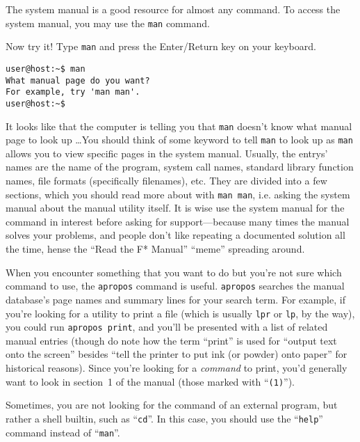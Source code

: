 \documentclass{extbook}
\begin{document}
The system manual is a good resource for almost any command.  To access the system manual, you may use the \verb|man| command.

Now try it!  Type \verb|man| and press the Enter/Return key on your keyboard.
\begin{verbatim}
user@host:~$ man
What manual page do you want?
For example, try 'man man'.
user@host:~$ 
\end{verbatim}

It looks like that the computer is telling you that \verb|man| doesn't know what manual page to look up \ldots You should think of some keyword to tell \verb|man| to look up as \verb|man| allows you to view specific pages in the system manual.  Usually, the entrys' names are the name of the program, system call names, standard library function names, file formats (specifically filenames), etc.  They are divided into a few sections, which you should read more about with \verb|man man|, i.e. asking the system manual about the manual utility itself.  It is wise use the system manual for the command in interest before asking for support---because many times the manual solves your problems, and people don't like repeating a documented solution all the time, hense the ``Read the F* Manual'' ``meme'' spreading around.

When you encounter something that you want to do but you're not sure which command to use, the \verb|apropos| command is useful.  \verb|apropos| searches the manual database's page names and summary lines for your search term.  For example, if you're looking for a utility to print a file (which is usually \verb|lpr| or \verb|lp|, by the way), you could run \verb|apropos print|, and you'll be presented with a list of related manual entries (though do note how the term ``print'' is used for ``output text onto the screen'' besides ``tell the printer to put ink (or powder) onto paper'' for historical reasons).  Since you're looking for a \emph{command} to print, you'd generally want to look in section~1 of the manual (those marked with ``\verb|(1)|'').

Sometimes, you are not looking for the command of an external program, but rather a shell builtin, such as ``\verb|cd|''.  In this case, you should use the ``\verb|help|'' command instead of ``\verb|man|''.

\end{document}
